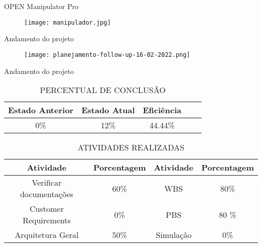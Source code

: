  \begin{frame}[t]{OPEN Manipulator Pro}
    \begin{figure}
        \texttt{[image: manipulador.jpg]}
    \end{figure}
\end{frame}
 \begin{frame}[t]{Andamento do projeto}
    \begin{figure}
        \texttt{[image: planejamento-follow-up-16-02-2022.png]}
    \end{figure}
\end{frame}

\begin{frame}[c]{Andamento do projeto}
    \begin{table}[ht!]
    \centering
        \caption{PERCENTUAL DE CONCLUSÃO}
        \begin{tabular}{|c|c|c|c|c|} \hline
            \textbf{Estado Anterior}&\textbf{Estado Atual}&\textbf{Eficiência}\\\hline
            0\% &12\% &44.44\% \\ \hline
        \end{tabular}
    \end{table}
    \begin{table}[ht!]
            \caption{ATIVIDADES REALIZADAS}
            \begin{tabular}{|c|c|c|c|} \hline
                \textbf{Atividade}&\textbf{Porcentagem}&\textbf{Atividade}&\textbf{Porcentagem}\\\hline
                Verificar documentações &60\% &   WBS        &80\% \\ \hline
                Customer Requirements   &0\%  &   PBS        &80  \% \\ \hline
                Arquitetura Geral       &50\% &   Simulação  &0\%  \\ \hline

            \end{tabular}
        \end{table}
\end{frame}
